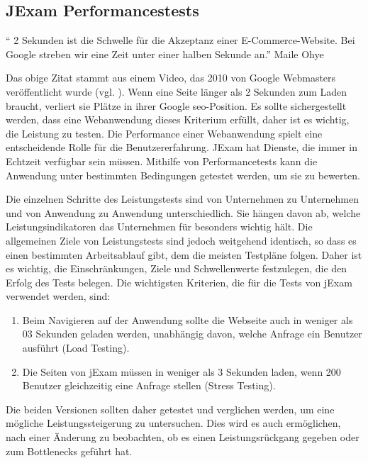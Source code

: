 \subsection{JExam Performancestests}

\begin{center}
`` 2 Sekunden ist die Schwelle f\"ur die Akzeptanz einer E-Commerce-Website.
Bei Google streben wir eine Zeit unter einer halben Sekunde an.'' Maile Ohye
\end{center}
\>

Das obige Zitat stammt aus einem Video, das 2010 von Google Webmasters
ver\"offentlicht wurde (vgl. \cite{Ohye2010}). Wenn eine Seite l\"anger
als 2 Sekunden zum Laden braucht, verliert sie Pl\"atze in ihrer Google
\acs{seo}-Position. Es sollte sichergestellt werden, dass eine
Webanwendung dieses Kriterium erfüllt, daher ist es wichtig,
die Leistung zu testen. Die Performance einer Webanwendung spielt eine
entscheidende Rolle f\"ur die Benutzererfahrung. JExam hat Dienste,
die immer in Echtzeit verf\"ugbar sein m\"ussen. Mithilfe von 
Performancetests kann die Anwendung unter bestimmten Bedingungen 
getestet werden, um sie zu bewerten.

Die einzelnen Schritte des Leistungstests sind von Unternehmen
zu Unternehmen und von Anwendung zu Anwendung unterschiedlich.
Sie hängen davon ab, welche Leistungsindikatoren das Unternehmen für
besonders wichtig hält. Die allgemeinen Ziele von Leistungstests
sind jedoch weitgehend identisch, so dass es einen bestimmten
Arbeitsablauf gibt, dem die meisten Testpläne folgen. Daher ist es
wichtig, die Einschränkungen, Ziele und Schwellenwerte festzulegen,
die den Erfolg des Tests belegen. Die wichtigsten Kriterien,
die für die Tests von jExam verwendet werden, sind:

\noindent
\begin{enumerate}
    \item Beim Navigieren auf der Anwendung sollte die Webseite auch in
    weniger als 03 Sekunden geladen werden, unabhängig davon, welche Anfrage
    ein Benutzer ausführt (Load Testing).
    \item Die Seiten von jExam müssen in weniger als 3 Sekunden laden,
    wenn 200 Benutzer gleichzeitig eine Anfrage stellen (Stress Testing).
\end{enumerate}

Die beiden Versionen sollten daher getestet und verglichen werden,
um eine mögliche Leistungssteigerung zu untersuchen.
Dies wird es auch ermöglichen, nach einer Änderung zu beobachten, ob
es einen Leistungsrückgang gegeben oder zum Bottlenecks geführt hat.